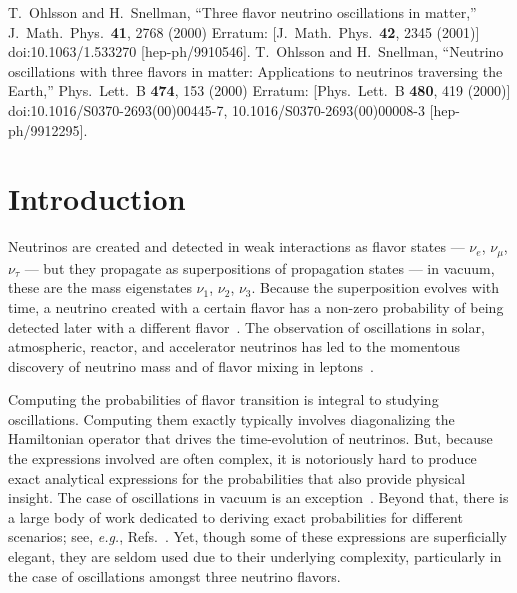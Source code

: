 \documentclass[final,5p,times,twocolumn]{elsarticle}
\newcommand{\eg}{{\it e.g.}}
\newcommand{\Refs}{Refs.}
\begin{document}
\begin{small}
\medskip
  
\begin{thebibliography}{0}
  T.~Ohlsson and H.~Snellman,
  ``Three flavor neutrino oscillations in matter,''
  J.\ Math.\ Phys.\  {\bf 41}, 2768 (2000)
  Erratum: [J.\ Math.\ Phys.\  {\bf 42}, 2345 (2001)]
  doi:10.1063/1.533270
  [hep-ph/9910546].
  T.~Ohlsson and H.~Snellman,
  ``Neutrino oscillations with three flavors in matter: Applications to neutrinos traversing the Earth,''
  Phys.\ Lett.\ B {\bf 474}, 153 (2000)
  Erratum: [Phys.\ Lett.\ B {\bf 480}, 419 (2000)]
  doi:10.1016/S0370-2693(00)00445-7, 10.1016/S0370-2693(00)00008-3
  [hep-ph/9912295].
\end{thebibliography}

\end{small}


\section{Introduction}\label{Section_Introduction}

Neutrinos are created and detected in weak interactions as flavor states --- $\nu_e$, $\nu_\mu$, $\nu_\tau$ --- but they propagate as superpositions of propagation states --- in vacuum, these are the mass eigenstates $\nu_1$, $\nu_2$, $\nu_3$.  Because the superposition evolves with time, a neutrino created with a certain flavor has a non-zero probability of being detected later with a different flavor\ \cite{Pontecorvo:1967fh, Barger:1980hs, Bilenky:2004sn, Fantini:2018itu}.  The observation of oscillations in solar, atmospheric, reactor, and accelerator neutrinos has led to the momentous discovery of neutrino mass and of flavor mixing in leptons\ \cite{Kajita:2016cak, McDonald:2016ixn}.

Computing the probabilities of flavor transition is integral to studying oscillations.  Computing them exactly typically involves diagonalizing the Hamiltonian operator that drives the time-evolution of neutrinos.  But, because the expressions involved are often complex, it is notoriously hard to produce exact analytical expressions for the probabilities that also provide physical insight.  The case of oscillations in vacuum is an exception\ \cite{Kayser:1981ye, Giunti:2007ry, Tanabashi:2018oca}.  Beyond that, there is a large body of work dedicated to deriving exact probabilities for different scenarios; see, \eg, \Refs\ \cite{Barger:1980tf, Petcov:1987zj, Zaglauer:1988gz, TorrenteLujan:1995qi, Balantekin:1997jp, Coleman:1998ti, Gago:2001xg, Kimura:2002wd, Harrison:2003fi, Kostelecky:2003xn, Kostelecky:2003cr, GonzalezGarcia:2004wg, Blennow:2004qd, Meloni:2009ia, Ando:2009ts, Abe:2014wla, Flores:2015mah, Popov:2018seq}.  Yet, though some of these expressions are superficially elegant, they are seldom used due to their underlying complexity, particularly in the case of oscillations amongst three neutrino flavors.
\end{document}
